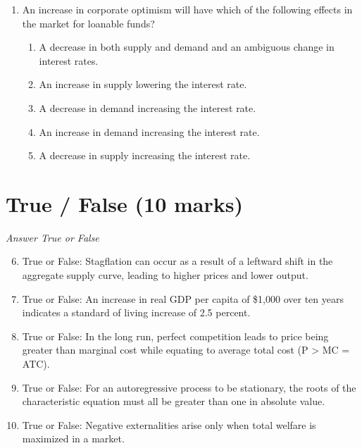 \documentclass[12pt]{article}
\begin{document}
\begin{enumerate}[label=\arabic*.]
\begin{enumerate}[label=(\alph*)]
    \item the anticipated inflation rate plus the nominal interest rate
    \item the nominal interest rate multiplied by the inflation rate
    \item what one sees when looking at bank literature
    \item the anticipated inflation rate minus the nominal interest rate
    \item the nominal interest rate minus anticipated inflation
\end{enumerate}
\item An increase in corporate optimism will have which of the following effects in the market for loanable funds?
\begin{enumerate}[label=(\alph*)]
    \item A decrease in both supply and demand and an ambiguous change in interest rates.
    \item An increase in supply lowering the interest rate.
    \item A decrease in demand increasing the interest rate.
    \item An increase in demand increasing the interest rate.
    \item A decrease in supply increasing the interest rate.
\end{enumerate}
\end{enumerate}

\section*{True / False (10 marks)}
\textit{Answer True or False}
\begin{enumerate}[label=\arabic*.]
\setcounter{enumi}{5}
\item True or False: Stagflation can occur as a result of a leftward shift in the aggregate supply curve, leading to higher prices and lower output.
\item True or False: An increase in real GDP per capita of \$1,000 over ten years indicates a standard of living increase of 2.5 percent.
\item True or False: In the long run, perfect competition leads to price being greater than marginal cost while equating to average total cost (P \textgreater{} MC = ATC).
\item True or False: For an autoregressive process to be stationary, the roots of the characteristic equation must all be greater than one in absolute value.
\item True or False: Negative externalities arise only when total welfare is maximized in a market.
\end{enumerate}
\end{document}

